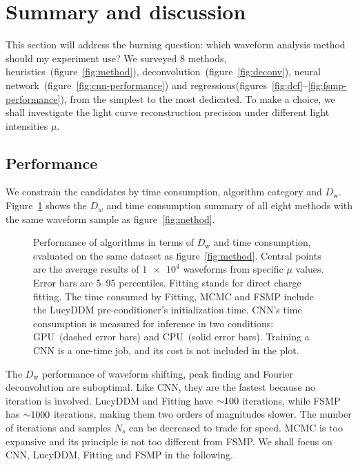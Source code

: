\section{Summary and discussion}
\label{sec:discussion}

This section will address the burning question: which waveform analysis method should my experiment use?  We surveyed 8 methods, heuristics~(figure~\ref{fig:method}), deconvolution~(figure~\ref{fig:deconv}), neural network~(figure~\ref{fig:cnn-performance}) and regressions(figures~\ref{fig:dcf}--\ref{fig:fsmp-performance}), from the simplest to the most dedicated.  To make a choice, we shall investigate the light curve reconstruction precision under different light intensities $\mu$.

\subsection{Performance}

We constrain the candidates by time consumption, algorithm category and $D_\mathrm{w}$.  Figure~\ref{fig:chargesummary} shows the $D_w$ and time consumption summary of all eight methods with the same waveform sample as figure~\ref{fig:method}.
\begin{figure}[H]
    \centering
    \resizebox{\textwidth}{!}{}
    \caption{\label{fig:chargesummary} Performance of algorithms in terms of $D_\mathrm{w}$ and time consumption, evaluated on the same dataset as figure~\ref{fig:method}. Central points are the average results of $\num[retain-unity-mantissa=false]{1e4}$ waveforms from specific $\mu$ values.  Error bars are 5--95 percentiles.  Fitting stands for direct charge fitting. The time consumed by Fitting, MCMC and FSMP include the LucyDDM pre-conditioner's initialization time.  CNN's time consumption is measured for inference in two conditions: GPU\protect\footnotemark~(dashed error bars) and CPU\protect\footnotemark~(solid error bars).  Training a CNN is a one-time job, and its cost is not included in the plot.}
\end{figure}
\addtocounter{footnote}{-2}

The $D_\mathrm{w}$ performance of waveform shifting, peak finding and Fourier deconvolution are suboptimal.  Like CNN, they are the fastest because no iteration is involved.  LucyDDM and Fitting have $\num{\sim 100}$ iterations, while FSMP has $\num{\sim 1000}$ iterations, making them two orders of magnitudes slower.  The number of iterations and samples $N_s$ can be decreased to trade for speed.  MCMC is too expansive and its principle is not too different from FSMP.  We shall focus on CNN, LucyDDM, Fitting and FSMP in the following.  

